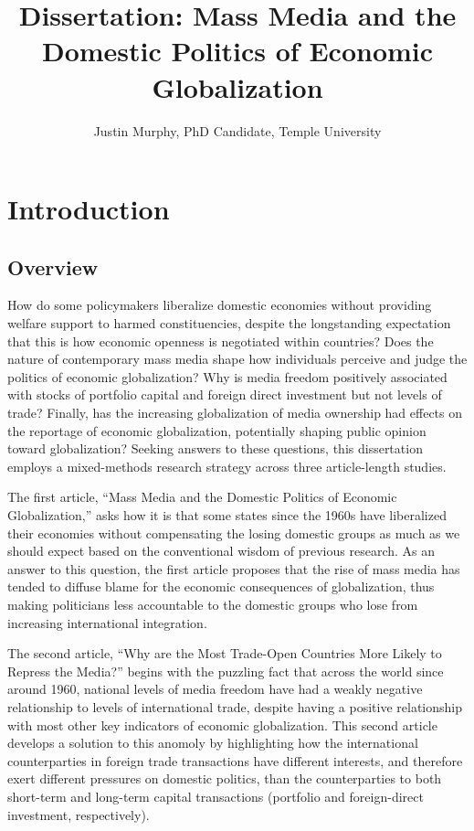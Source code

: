 \documentclass[12pt]{report}
\begin{document}
\title{Dissertation: Mass Media and the Domestic Politics of Economic Globalization}
\author{Justin Murphy, PhD Candidate, Temple University}

\maketitle

\tableofcontents

\doublespacing

\chapter{Introduction}

\section{Overview}

How do some policymakers liberalize domestic economies without providing welfare support to harmed constituencies, despite the longstanding expectation that this is how economic openness is negotiated within countries? Does the nature of contemporary mass media shape how individuals perceive and judge the politics of economic globalization?  Why is media freedom positively associated with stocks of portfolio capital and foreign direct investment but not levels of trade? Finally, has the increasing globalization of media ownership had effects on the reportage of economic globalization, potentially shaping public opinion toward globalization? Seeking answers to these questions, this dissertation employs a mixed-methods research strategy across three article-length studies.

The first article, ``Mass Media and the Domestic Politics of Economic Globalization,'' asks how it is that some states since the 1960s have liberalized their economies without compensating the losing domestic groups as much as we should expect based on the conventional wisdom of previous research. As an answer to this question, the first article proposes that the rise of mass media has tended to diffuse blame for the economic consequences of globalization, thus making politicians less accountable to the domestic groups who lose from increasing international integration.

The second article, ``Why are the Most Trade-Open Countries More Likely to Repress the Media?'' begins with the puzzling fact that across the world since around 1960, national levels of media freedom have had a weakly negative relationship to levels of international trade, despite having a positive relationship with most other key indicators of economic globalization. This second article develops a solution to this anomoly by highlighting how the international counterparties in foreign trade transactions have different interests, and therefore exert different pressures on domestic politics, than the counterparties to both short-term and long-term capital transactions (portfolio and foreign-direct investment, respectively).
\end{document}
